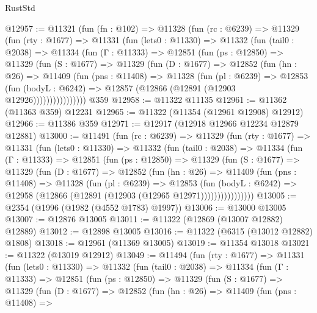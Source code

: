 \begin{lexlean}{RustStd}
\begin{coremodule}
@12957 := @11321
    (fun (fn : @102) =>
    @11328
      (fun (rc : @6239) =>
      @11329
        (fun (rty : @1677) =>
        @11331
          (fun (lets0 : @11330) =>
          @11332
            (fun (tail0 : @2038) =>
            @11334
              (fun (Γ : @11333) =>
              @12851
                (fun (ps : @12850) =>
                @11329
                  (fun (S : @1677) =>
                  @11329
                    (fun (D : @1677) =>
                    @12852
                      (fun (hn : @26) =>
                      @11409
                        (fun (pns : @11408) =>
                        @11328
                          (fun (pl : @6239) =>
                          @12853
                            (fun (bodyL : @6242) =>
                            @12857 (@12866 (@12891 (@12903 @12926))))))))))))))))
    @359
@12958 := @11322 @11135
@12961 := @11362 (@11363 @359) @12231
@12965 := @11322 (@11354 (@12961 @12908) @12912)
@12966 := @11386 @359
@12971 := @12917 (@12918 @12966 @12234 @12879 @12881)
@13000 := @11491
    (fun (rc : @6239) =>
    @11329
      (fun (rty : @1677) =>
      @11331
        (fun (lets0 : @11330) =>
        @11332
          (fun (tail0 : @2038) =>
          @11334
            (fun (Γ : @11333) =>
            @12851
              (fun (ps : @12850) =>
              @11329
                (fun (S : @1677) =>
                @11329
                  (fun (D : @1677) =>
                  @12852
                    (fun (hn : @26) =>
                    @11409
                      (fun (pns : @11408) =>
                      @11328
                        (fun (pl : @6239) =>
                        @12853
                          (fun (bodyL : @6242) =>
                          @12958 (@12866 (@12891 (@12903 (@12965 @12971))))))))))))))))
@13005 := @2354 (@1996 (@1982 (@4552 @1783) @1997))
@13006 := @13000 @13005
@13007 := @12876 @13005
@13011 := @11322 (@12869 (@13007 @12882) @12889)
@13012 := @12898 @13005
@13016 := @11322 (@6315 (@13012 @12882) @1808)
@13018 := @12961 (@11369 @13005)
@13019 := @11354 @13018
@13021 := @11322 (@13019 @12912)
@13049 := @11494
    (fun (rty : @1677) =>
    @11331
      (fun (lets0 : @11330) =>
      @11332
        (fun (tail0 : @2038) =>
        @11334
          (fun (Γ : @11333) =>
          @12851
            (fun (ps : @12850) =>
            @11329
              (fun (S : @1677) =>
              @11329
                (fun (D : @1677) =>
                @12852
                  (fun (hn : @26) =>
                  @11409
                    (fun (pns : @11408) =>

\end{coremodule}
\end{lexlean}
